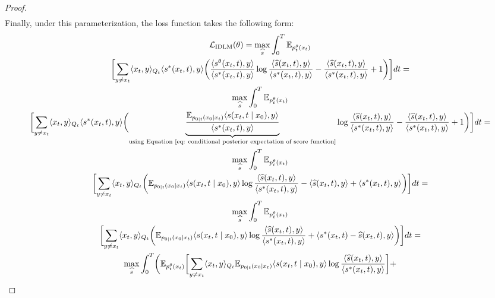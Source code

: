 \begin{proof}
\begin{gather}
            \end{gather}
            Finally, under this parameterization, the loss function takes the following form:
            \begin{gather} 
                \LC_{\text{IDLM}}(\theta) =  \max_{\widehat{s}}\int_0^T \EE_{p_t^{\theta}(x_t)}\nonumber\\
                 \biggl[\sum_{y \neq x_t} \langle x_t, y\rangle_{Q_t} \langle s^{*}(x_t,t), y\rangle\biggl(\frac{\langle {s}^{\theta}(x_t,t), y\rangle}{\langle s^{*}(x_t,t), y\rangle} \log \frac{\langle \widehat{s}(x_t,t), y\rangle}{\langle s^{*}(x_t,t), y\rangle} -  \frac{\langle \widehat{s}(x_t,t), y\rangle}{\langle s^{*}(x_t,t), y\rangle}  + 1\biggr)\biggr]dt =
                 \nonumber \\
                 \max_{\widehat{s}}\int_0^T \EE_{p_t^{\theta}(x_t)}\nonumber\\
                 \biggl[\sum_{y \neq x_t} \langle x_t, y\rangle_{Q_t} \langle s^{*}(x_t,t), y\rangle\biggl(\underbrace{\frac{\mathbb{E}_{p_{0 \mid t}(x_0 \mid x_t)} \langle s(x_t, t\mid x_0), y \rangle}{\langle s^{*}(x_t,t), y\rangle}}_{\text{using Equation~\eqref{eq: conditional posterior expectation of score function}}} \log \frac{\langle \widehat{s}(x_t,t), y\rangle}{\langle s^{*}(x_t,t), y\rangle} -  \frac{\langle \widehat{s}(x_t,t), y\rangle}{\langle s^{*}(x_t,t), y\rangle}  + 1\biggr)\biggr]dt =
                 \nonumber \\
                 \max_{\widehat{s}}\int_0^T \EE_{p_t^{\theta}(x_t)}\nonumber\\
                 \biggl[\sum_{y \neq x_t} \langle x_t, y\rangle_{Q_t} \biggl(\mathbb{E}_{p_{0 \mid t}(x_0 \mid x_t)} \langle s(x_t, t\mid x_0), y \rangle \log \frac{\langle \widehat{s}(x_t,t), y\rangle}{\langle s^{*}(x_t,t), y\rangle} - \langle \widehat{s}(x_t,t), y\rangle  + \langle s^{*}(x_t,t), y\rangle\biggr)\biggr]dt =
                 \nonumber \\
                 \max_{\widehat{s}}\int_0^T \EE_{p_t^{\theta}(x_t)}\nonumber\\
                 \biggl[\sum_{y \neq x_t} \langle x_t, y\rangle_{Q_t} \biggl(\mathbb{E}_{p_{0 \mid t}(x_0 \mid x_t)} \langle s(x_t, t\mid x_0), y \rangle \log \frac{\langle \widehat{s}(x_t,t), y\rangle}{\langle s^{*}(x_t,t), y\rangle} + \langle s^{*}(x_t,t) - \widehat{s}(x_t,t), y\rangle\biggr)\biggr]dt =
                 \nonumber \\
                 \max_{\widehat{s}}\int_0^T  \biggl(\EE_{p_t^{\theta}(x_t)}
                \biggl[\sum_{y \neq x_t} \langle x_t, y\rangle_{Q_t} \mathbb{E}_{p_{0 \mid t}(x_0 \mid x_t)} \langle s(x_t, t\mid x_0), y \rangle \log \frac{\langle \widehat{s}(x_t,t), y\rangle}{\langle s^{*}(x_t,t), y\rangle}\biggr] + \\

\end{gather}
\end{proof}

